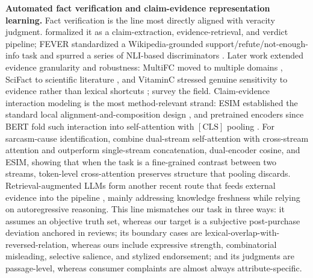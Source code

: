 \documentclass[letterpaper]{article}
\begin{document}
\textbf{Automated fact verification and claim-evidence representation learning.} Fact verification is the line most directly aligned with veracity judgment. \citet{vlachos2014factchecking} formalized it as a claim-extraction, evidence-retrieval, and verdict pipeline; FEVER standardized a Wikipedia-grounded support/refute/not-enough-info task and spurred a series of NLI-based discriminators \citep{thorne2018fever,bowman2015snli}. Later work extended evidence granularity and robustness: MultiFC moved to multiple domains \citep{augenstein2019multifc}, SciFact to scientific literature \citep{wadden2020scifact}, and VitaminC stressed genuine sensitivity to evidence rather than lexical shortcuts \citep{schuster2021vitaminc}; \citet{guo2022survey} survey the field. Claim-evidence interaction modeling is the most method-relevant strand: ESIM established the standard local alignment-and-composition design \citep{chen2017esim}, and pretrained encoders since BERT fold such interaction into self-attention with $[\mathrm{CLS}]$ pooling \citep{devlin2019bert,cui2021wwm}. For sarcasm-cause identification, \citet{li2025sarcasm} combine dual-stream self-attention with cross-stream attention and outperform single-stream concatenation, dual-encoder cosine, and ESIM, showing that when the task is a fine-grained contrast between two streams, token-level cross-attention preserves structure that pooling discards. Retrieval-augmented LLMs form another recent route that feeds external evidence into the pipeline \citep{putta2025claimcheck,vladika2024survey}, mainly addressing knowledge freshness while relying on autoregressive reasoning. This line mismatches our task in three ways: it assumes an objective truth set, whereas our target is a subjective post-purchase deviation anchored in reviews; its boundary cases are lexical-overlap-with-reversed-relation, whereas ours include expressive strength, combinatorial misleading, selective salience, and stylized endorsement; and its judgments are passage-level, whereas consumer complaints are almost always attribute-specific.
\end{document}
